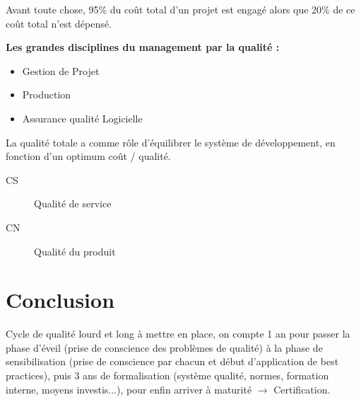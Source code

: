 Avant toute chose,  95\% du coût total d’un projet est engagé alors que 20\% de ce coût total n’est dépensé. %

\textbf{Les grandes disciplines du management par la qualité :}\hfill\\
\begin{itemize}
	\item Gestion de Projet
	\item Production
	\item Assurance qualité Logicielle
\end{itemize}

La qualité totale a comme rôle d’équilibrer le système de développement, en fonction d’un optimum coût / qualité.

\begin{description}
\item[CS] Qualité de service
\item[CN] Qualité du produit
\end{description}

\section{Conclusion}

Cycle de qualité lourd et long à mettre en place, on compte 1 an pour passer la phase d’éveil (prise de conscience des problèmes de qualité) à la phase de sensibilisation (prise de conscience par chacun et début d'application de best practices), puis 3 ans de formalisation (système qualité, normes, formation interne, moyens investis...), pour enfin arriver à maturité $\rightarrow$ Certification.
